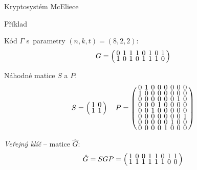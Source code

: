 \documentclass{beamer}
\begin{document}
\begin{frame}{Kryptosystém McEliece}

    \begin{exampleblock}{Příklad}

        Kód $\Gamma$ s~parametry $(n,k,t)=(8,2,2)$:
        $$
        \arraycolsep=2pt
        \def\arraystretch{0.5}
            G = \left(
                \begin{array}{*{8}{c}}
                    0 & 1 & 1 & 1 & 0 & 1 & 0 & 1 \\
                    1 & 0 & 1 & 0 & 1 & 1 & 1 & 0 \\
                \end{array}
            \right)
        $$

        Náhodné matice $S$ a $P$:
        $$
        \arraycolsep=2pt
        \def\arraystretch{0.5}
            S = \left(
                \begin{array}{*{2}{c}}
                    1 & 0 \\
                    1 & 1 \\
                \end{array}
            \right)
            \quad
            P = \left(
                \begin{array}{*{8}{c}}
                    0 & 1 & 0 & 0 & 0 & 0 & 0 & 0 \\
                    1 & 0 & 0 & 0 & 0 & 0 & 0 & 0 \\
                    0 & 0 & 0 & 0 & 0 & 0 & 1 & 0 \\
                    0 & 0 & 0 & 1 & 0 & 0 & 0 & 0 \\
                    0 & 0 & 1 & 0 & 0 & 0 & 0 & 0 \\
                    0 & 0 & 0 & 0 & 0 & 0 & 0 & 1 \\
                    0 & 0 & 0 & 0 & 0 & 1 & 0 & 0 \\
                    0 & 0 & 0 & 0 & 1 & 0 & 0 & 0 \\
                \end{array}
            \right)
        $$

        \emph{Veřejný klíč} -- matice $\hat{G}$:
        $$
        \arraycolsep=2pt
        \def\arraystretch{0.5}
            \hat{G} = S G P  = \left(
                \begin{array}{*{8}{c}}
                    1 & 0 & 0 & 1 & 1 & 0 & 1 & 1 \\
                    1 & 1 & 1 & 1 & 1 & 1 & 0 & 0 \\
                \end{array}
            \right)
        $$

    \end{exampleblock}

\end{frame}
\end{document}
